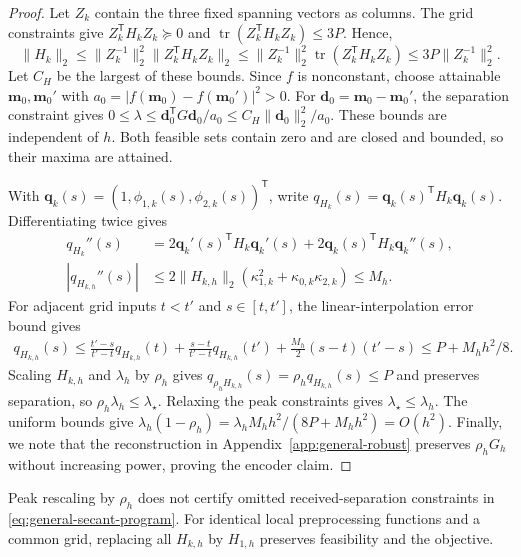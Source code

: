 \documentclass[journal,12pt,onecolumn,draftclsnofoot]{IEEEtran}
\newcommand{\T}{\mathsf T}\newcommand{\suc}{\succeq}
\begin{document}
\begin{proof}

Let $Z_k$ contain the three fixed spanning vectors as columns.
The grid constraints give $Z_k^\T H_kZ_k\succeq0$ and
$\operatorname{tr}(Z_k^\T H_kZ_k)\le3P$. Hence,
$$
\|H_k\|_2\le\|Z_k^{-1}\|_2^2\|Z_k^\T H_kZ_k\|_2
\le\|Z_k^{-1}\|_2^2\operatorname{tr}(Z_k^\T H_kZ_k)
\le3P\|Z_k^{-1}\|_2^2.
$$
Let $C_H$ be the largest of these bounds.
Since $f$ is nonconstant, choose attainable $\boldsymbol m_0,\boldsymbol m_0'$ with
$a_0=|f(\boldsymbol m_0)-f(\boldsymbol m_0')|^2>0$.
For $\boldsymbol d_0=\boldsymbol m_0-\boldsymbol m_0'$, the separation constraint gives
$0\le\lambda\le\boldsymbol d_0^\T G\boldsymbol d_0/a_0
\le C_H\|\boldsymbol d_0\|_2^2/a_0$.
These bounds are independent of $h$. Both feasible sets contain zero
and are closed and bounded, so their maxima are attained.


With $\boldsymbol q_k(s)=(1,\phi_{1,k}(s),\phi_{2,k}(s))^\T$,
write $q_{H_k}(s)=\boldsymbol q_k(s)^\T H_k\boldsymbol q_k(s)$.
Differentiating twice gives
$$
\begin{aligned}
q_{H_k}''(s)
&=2\boldsymbol q_k'(s)^\T H_k\boldsymbol q_k'(s)
+2\boldsymbol q_k(s)^\T H_k\boldsymbol q_k''(s),\\
|q_{H_{k,h}}''(s)|
&\le2\|H_{k,h}\|_2(\kappa_{1,k}^2+\kappa_{0,k}\kappa_{2,k})
\le M_h.
\end{aligned}
$$
For adjacent grid inputs $t<t'$ and $s\in[t,t']$, the linear-interpolation error bound gives
\begin{align*}
q_{H_{k,h}}(s)
\le\frac{t'-s}{t'-t}q_{H_{k,h}}(t)
 +\frac{s-t}{t'-t}q_{H_{k,h}}(t')
 +\frac{M_h}{2}(s-t)(t'-s)
\le P+M_hh^2/8.
\end{align*}
Scaling $H_{k,h}$ and $\lambda_h$ by $\rho_h$ gives $q_{\rho_hH_{k,h}}(s)=\rho_hq_{H_{k,h}}(s)\le P$
and preserves separation, so $\rho_h\lambda_h\le\lambda_\star$.
Relaxing the peak constraints gives $\lambda_\star\le\lambda_h$.
The uniform bounds give
$\lambda_h(1-\rho_h)=\lambda_h M_hh^2/(8P+M_hh^2)=O(h^2)$. Finally, we note that the reconstruction in Appendix~\ref{app:general-robust} preserves
$\rho_hG_h$ without increasing power, proving the encoder claim.


\end{proof}


Peak rescaling by $\rho_h$ does not certify omitted received-separation constraints in \eqref{eq:general-secant-program}.
For identical local preprocessing functions and a common grid, replacing
all $H_{k,h}$ by $H_{1,h}$ preserves feasibility and the objective.
\end{document}
